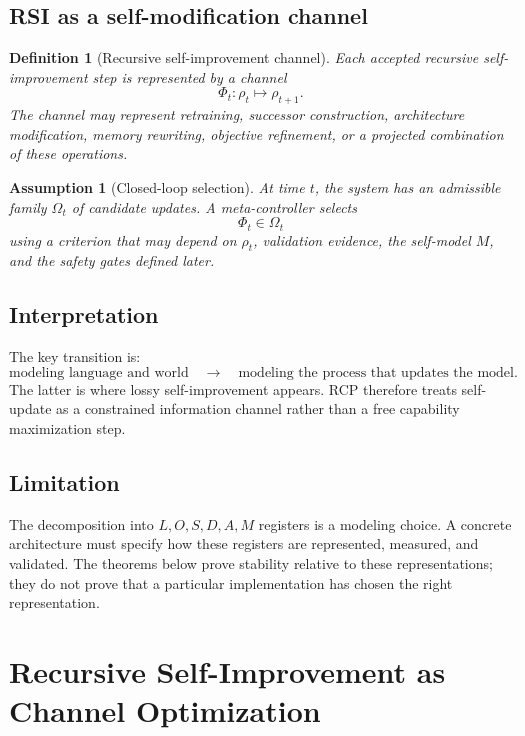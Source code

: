 \documentclass[11pt]{article}
\newtheorem{definition}[theorem]{Definition}
\newtheorem{assumption}[theorem]{Assumption}
\newcommand{\1}{\mathbf{1}}
\begin{document}
\subsection{RSI as a self-modification channel}

\begin{definition}[Recursive self-improvement channel]
Each accepted recursive self-improvement step is represented by a channel
\[
\Phi_t:\rho_t\mapsto \rho_{t+1}.
\]
The channel may represent retraining, successor construction, architecture modification, memory rewriting, objective refinement, or a projected combination of these operations.
\end{definition}

\begin{assumption}[Closed-loop selection]
At time \(t\), the system has an admissible family \(\Omega_t\) of candidate updates. A meta-controller selects
\[
\Phi_t\in\Omega_t
\]
using a criterion that may depend on \(\rho_t\), validation evidence, the self-model \(M\), and the safety gates defined later.
\end{assumption}

\subsection{Interpretation}

The key transition is:
\[
\text{modeling language and world}
\quad\longrightarrow\quad
\text{modeling the process that updates the model}.
\]
The latter is where lossy self-improvement appears. RCP therefore treats self-update as a constrained information channel rather than a free capability maximization step.

\subsection{Limitation}

The decomposition into \(L,O,S,D,A,M\) registers is a modeling choice. A concrete architecture must specify how these registers are represented, measured, and validated. The theorems below prove stability relative to these representations; they do not prove that a particular implementation has chosen the right representation.

\section{Recursive Self-Improvement as Channel Optimization}
\end{document}
